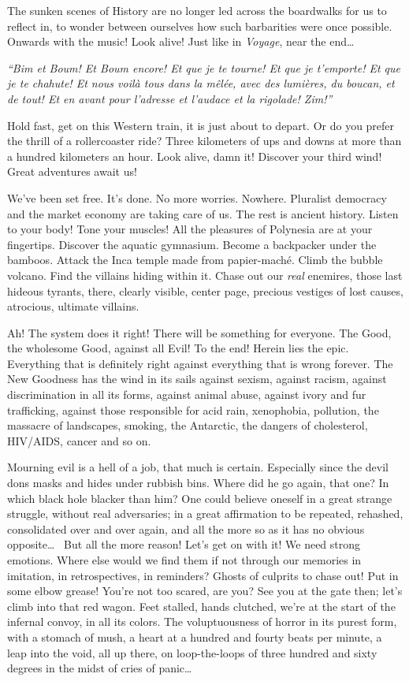 The sunken scenes of History are no longer led across the boardwalks for us to reflect in, to wonder between ourselves how such barbarities were once possible. Onwards with the music! Look alive! Just like in \textit{Voyage}, near the end\dots~

\begin{displayquote}
	\textit{
		``Bim et Boum! Et Boum encore! Et que je te tourne! Et que je t’emporte! Et que je te chahute! Et nous voilà tous dans la m\^el\'ee, avec des lumi\`eres, du boucan, et de tout! Et en avant pour l’adresse et l’audace et la rigolade! Zim!''
	}
\end{displayquote}

Hold fast, get on this Western train, it is just about to depart. Or do you prefer the thrill of a rollercoaster ride? Three kilometers of ups and downs at more than a hundred kilometers an hour. Look alive, damn it! Discover your third wind! Great adventures await us!

We've been set free. It's done. No more worries. Nowhere. Pluralist democracy and the market economy are taking care of us. The rest is ancient history. Listen to your body! Tone your muscles! All the pleasures of Polynesia are at your fingertips. Discover the aquatic gymnasium. Become a backpacker under the bamboos. Attack the Inca temple made from papier-mach\'e. Climb the bubble volcano. Find the villains hiding within it. Chase out our \textit{real} enemires, those last hideous tyrants, there, clearly visible, center page, precious vestiges of lost causes, atrocious, ultimate villains.

Ah! The system does it right! There will be something for everyone. The Good, the wholesome Good, against all Evil! To the end! Herein lies the epic. Everything that is definitely right against everything that is wrong forever. The New Goodness has the wind in its sails against sexism, against racism, against discrimination in all its forms, against animal abuse, against ivory and fur trafficking, against those responsible for acid rain, xenophobia, pollution, the massacre of landscapes, smoking, the Antarctic, the dangers of cholesterol, HIV/AIDS, cancer and so on.

Mourning evil is a hell of a job, that much is certain. Especially since the devil dons masks and hides under rubbish bins. Where did he go again, that one? In which black hole blacker than him? One could believe oneself in a great strange struggle, without real adversaries; in a great affirmation to be repeated, rehashed, consolidated over and over again, and all the more so as it has no obvious opposite\dots~ But all the more reason! Let's get on with it!  We need strong emotions. Where else would we find them if not through our memories in imitation, in retrospectives, in reminders? Ghosts of culprits to chase out! Put in some elbow grease! You're not too scared, are you? See you at the gate then; let's climb into that red wagon. Feet stalled, hands clutched, we're at the start of the infernal convoy, in all its colors. The voluptuousness of horror in its purest form, with a stomach of mush, a heart at a hundred and fourty beats per minute, a leap into the void, all up there, on loop-the-loops of three hundred and sixty degrees in the midst of cries of panic\dots~

